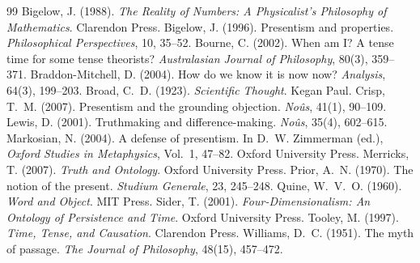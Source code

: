 \documentclass{situationist-preprint}
\begin{document}
\begin{thebibliography}{99}\small
{} Bigelow, J. (1988). \emph{The Reality of Numbers: A Physicalist's Philosophy of Mathematics}. Clarendon Press.
 Bigelow, J. (1996). Presentism and properties. \emph{Philosophical Perspectives}, 10, 35--52.
 Bourne, C. (2002). When am I? A tense time for some tense theorists? \emph{Australasian Journal of Philosophy}, 80(3), 359--371.
 Braddon-Mitchell, D. (2004). How do we know it is now now? \emph{Analysis}, 64(3), 199--203.
 Broad, C.~D. (1923). \emph{Scientific Thought}. Kegan Paul.
 Crisp, T.~M. (2007). Presentism and the grounding objection. \emph{No\^us}, 41(1), 90--109.
 Lewis, D. (2001). Truthmaking and difference-making. \emph{No\^us}, 35(4), 602--615.
 Markosian, N. (2004). A defense of presentism. In D.~W. Zimmerman (ed.), \emph{Oxford Studies in Metaphysics}, Vol.~1, 47--82. Oxford University Press.
 Merricks, T. (2007). \emph{Truth and Ontology}. Oxford University Press.
 Prior, A.~N. (1970). The notion of the present. \emph{Studium Generale}, 23, 245--248.
 Quine, W.~V.~O. (1960). \emph{Word and Object}. MIT Press.
 Sider, T. (2001). \emph{Four-Dimensionalism: An Ontology of Persistence and Time}. Oxford University Press.
 Tooley, M. (1997). \emph{Time, Tense, and Causation}. Clarendon Press.
 Williams, D.~C. (1951). The myth of passage. \emph{The Journal of Philosophy}, 48(15), 457--472.
\end{thebibliography}
\end{document}
